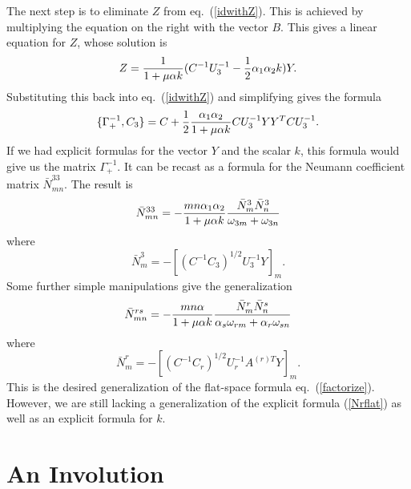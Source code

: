 \documentclass[a4paper,12pt]{article}
\begin{document}
The next step is to eliminate $Z$ from eq.~(\ref{idwithZ}). This
is achieved by multiplying the equation on the right with the
vector $B$. This gives a linear equation for $Z$, whose solution
is
\begin{equation}
Z = {1\over 1 + \mu \alpha k}(C^{-1} U_3^{-1} - {1\over 2}
\alpha_1 \alpha_2 k)  Y.
\end{equation}
Substituting this back into eq.~(\ref{idwithZ}) and simplifying
gives the formula
\begin{equation} \label{symformula}
\{ \Gamma_+^{-1} , C_3\} = C + {1\over2} {\alpha_1 \alpha_2 \over
1 + \mu \alpha k} C U_3^{-1} Y Y^T CU_3^{-1}.
\end{equation}
If we had explicit formulas for the vector $Y$ and the scalar $k$,
this formula would give us the matrix $\Gamma_+^{-1}$. It can be
recast as a formula for the Neumann coefficient matrix $\bar
N^{33}_{mn}$. The result is
\begin{equation}
\bar N^{33}_{mn} = - {mn\alpha_1 \alpha_2 \over 1 + \mu \alpha k}
{\bar N_m^3 \bar N_n^3 \over \omega_{3m} + \omega_{3n}}
\end{equation}
where
\begin{equation}
\bar N_m^3 = -\left[ (C^{-1}C_3)^{1/2} U_3^{-1} Y\right]_m.
\end{equation}
Some further simple manipulations give the generalization
\begin{equation}
\bar N^{rs}_{mn} = - {mn\alpha \over 1 + \mu \alpha k} {\bar N_m^r
\bar N_n^s \over \alpha_s\omega_{rm} + \alpha_r\omega_{sn}}
\end{equation}
where
\begin{equation}
\bar N_m^r = -\left[ (C^{-1}C_r)^{1/2} U_r^{-1} A^{(r)T}
Y\right]_m.
\end{equation}
This is the desired generalization of the flat-space formula
eq.~(\ref{factorize}). However, we are still lacking a
generalization of the explicit formula (\ref{Nrflat}) as well as
an explicit formula for $k$.

\section{An Involution}
\end{document}

